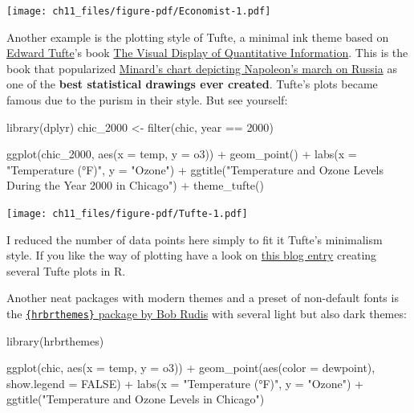 \documentclass[
  letterpaper,
  DIV=11,
  numbers=noendperiod]{scrreprt}
\newenvironment{Shaded}{\begin{snugshade}}{\end{snugshade}}
\newcommand{\AttributeTok}[1]{\textcolor[rgb]{0.40,0.45,0.13}{#1}}
\newcommand{\ConstantTok}[1]{\textcolor[rgb]{0.56,0.35,0.01}{#1}}
\newcommand{\DecValTok}[1]{\textcolor[rgb]{0.68,0.00,0.00}{#1}}
\newcommand{\FunctionTok}[1]{\textcolor[rgb]{0.28,0.35,0.67}{#1}}
\newcommand{\NormalTok}[1]{\textcolor[rgb]{0.00,0.23,0.31}{#1}}
\newcommand{\OtherTok}[1]{\textcolor[rgb]{0.00,0.23,0.31}{#1}}
\newcommand{\SpecialCharTok}[1]{\textcolor[rgb]{0.37,0.37,0.37}{#1}}
\newcommand{\StringTok}[1]{\textcolor[rgb]{0.13,0.47,0.30}{#1}}
\begin{document}
\texttt{[image: ch11\_files/figure-pdf/Economist-1.pdf]}

Another example is the plotting style of Tufte, a minimal ink theme
based on \href{http://ww\%20w.aiga.org/medalist-edwardtufte}{Edward
Tufte}'s book \href{https://www.edwardtufte.com/tufte/books_vdqi}{The
Visual Display of Quantitative Information}. This is the book that
popularized \href{https://www.edwardtufte.com/tufte/minard}{Minard's
chart depicting Napoleon's march on Russia} as one of the \textbf{best
statistical drawings ever created}. Tufte's plots became famous due to
the purism in their style. But see yourself:

\begin{Shaded}
\begin{Highlighting}[]
\FunctionTok{library}\NormalTok{(dplyr)}
\NormalTok{chic\_2000 }\OtherTok{\textless{}{-}} \FunctionTok{filter}\NormalTok{(chic, year }\SpecialCharTok{==} \DecValTok{2000}\NormalTok{)}

\FunctionTok{ggplot}\NormalTok{(chic\_2000, }\FunctionTok{aes}\NormalTok{(}\AttributeTok{x =}\NormalTok{ temp, }\AttributeTok{y =}\NormalTok{ o3)) }\SpecialCharTok{+}
  \FunctionTok{geom\_point}\NormalTok{() }\SpecialCharTok{+}
  \FunctionTok{labs}\NormalTok{(}\AttributeTok{x =} \StringTok{"Temperature (°F)"}\NormalTok{, }\AttributeTok{y =} \StringTok{"Ozone"}\NormalTok{) }\SpecialCharTok{+}
  \FunctionTok{ggtitle}\NormalTok{(}\StringTok{"Temperature and Ozone Levels During the Year 2000 in Chicago"}\NormalTok{) }\SpecialCharTok{+}
  \FunctionTok{theme\_tufte}\NormalTok{()}
\end{Highlighting}
\end{Shaded}

\texttt{[image: ch11\_files/figure-pdf/Tufte-1.pdf]}

I reduced the number of data points here simply to fit it Tufte's
minimalism style. If you like the way of plotting have a look on
\href{http://motioninsocial.com/tufte/}{this blog entry} creating
several Tufte plots in R.

Another neat packages with modern themes and a preset of non-default
fonts is the
\href{https://github.com/hrbrmstr/hrbrthemes}{\texttt{\{hrbrthemes\}}
package by Bob Rudis} with several light but also dark themes:

\begin{Shaded}
\begin{Highlighting}[]
\FunctionTok{library}\NormalTok{(hrbrthemes)}

\FunctionTok{ggplot}\NormalTok{(chic, }\FunctionTok{aes}\NormalTok{(}\AttributeTok{x =}\NormalTok{ temp, }\AttributeTok{y =}\NormalTok{ o3)) }\SpecialCharTok{+}
  \FunctionTok{geom\_point}\NormalTok{(}\FunctionTok{aes}\NormalTok{(}\AttributeTok{color =}\NormalTok{ dewpoint), }\AttributeTok{show.legend =} \ConstantTok{FALSE}\NormalTok{) }\SpecialCharTok{+}
  \FunctionTok{labs}\NormalTok{(}\AttributeTok{x =} \StringTok{"Temperature (°F)"}\NormalTok{, }\AttributeTok{y =} \StringTok{"Ozone"}\NormalTok{) }\SpecialCharTok{+}
  \FunctionTok{ggtitle}\NormalTok{(}\StringTok{"Temperature and Ozone Levels in Chicago"}\NormalTok{)}
\end{Highlighting}
\end{Shaded}
\end{document}
